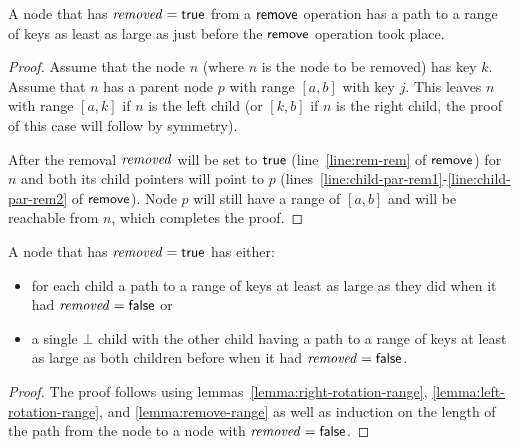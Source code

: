 \begin{lemma}
\label{lemma:remove-range}
A node that has $\ms{removed}=\lit{true}$ from a $\act{remove}$ operation has a path to a range of keys as least as large as just before the $\act{remove}$ operation took place.
\end{lemma}
\begin{proof}
Assume that the node $n$ (where $n$ is the node to be removed) has key $k$.
Assume that $n$ has a parent node $p$ with range $[a, b]$ with key $j$.
This leaves $n$ with range $[a, k]$ if $n$ is the left child (or $[k, b]$ if $n$ is the right child, the proof of this case will follow by symmetry).

After the removal $\ms{removed}$ will be set to $\lit{true}$ (line~\ref{line:rem-rem} of $\act{remove}$) for $n$ and both its child pointers will point
to $p$ (lines~\ref{line:child-par-rem1}-\ref{line:child-par-rem2} of $\act{remove}$).
Node $p$ will still have a range of $[a, b]$ and will be reachable from $n$, which completes the proof.
\end{proof}

\begin{lemma}
\label{lemma:range}
A node that has $\ms{removed}=\lit{true}$ has either:
\begin{itemize}
\item for each child a path to a range of keys at least as large as they did when it had $\ms{removed}=\lit{false}$ or
\item a single $\bot$ child with the other child having a path to a range of keys at least as large as both children before when it had $\ms{removed}=\lit{false}$.
\end{itemize}
\end{lemma}
\begin{proof}
The proof follows using lemmas~\ref{lemma:right-rotation-range}, \ref{lemma:left-rotation-range}, and \ref{lemma:remove-range} as well as induction on the length
of the path from the node to a node with $\ms{removed}=\lit{false}$.
\end{proof}


